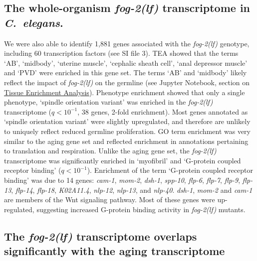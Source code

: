 \documentclass[10pt,letterpaper,twocolumn]{article}
\newcommand{\cel}{\emph{C.~elegans}}
\newcommand{\fog}{\emph{\mbox{fog-2(lf)}}}
\newcommand{\gene}[1]{\emph{\mbox{#1}}}
\newcommand{\fogn}{1,881}
\newcommand{\tffog}{60}
\begin{document}
\subsection*{The whole-organism \fog{} transcriptome in \cel{}.}

We were also able to identify \fogn{} genes associated with the \fog{} genotype,
including \tffog{} transcription factors (see SI file 3).
TEA showed that the terms `AB', `midbody', `uterine muscle', `cephalic sheath
cell', `anal depressor muscle' and `PVD' were enriched in this gene set. The
terms `AB' and `midbody' likely reflect the impact of \fog{} on the germline
(see Jupyter Notebook, section on
\href{https://wormlabcaltech.github.io/Angeles_Leighton_2016/RNASeqAnalysis.html#Run-TEA}
{Tissue Enrichment Analysis}).
Phenotype enrichment showed that only a single phenotype, `spindle orientation
variant' was enriched in the \fog{} transcriptome ($q<10^{-1}$, 38 genes, 2-fold
enrichment). Most genes annotated as `spindle orientation variant' were
slightly upregulated, and therefore are unlikely to uniquely reflect reduced
germline proliferation. GO term enrichment was very similar to the aging gene
set and reflected enrichment in annotations pertaining to translation and
respiration. Unlike the aging gene set, the \fog{} transcriptome was
significantly enriched in `myofibril' and `G-protein coupled receptor binding'
($q<10^{-1}$). Enrichment of the term `G-protein coupled receptor binding' was
due to 14 genes: \gene{cam-1}, \gene{mom-2},  \gene{dsh-1}, \gene{spp-10},
\gene{flp-6}, \gene{flp-7}, \gene{flp-9}, \gene{flp-13}, \gene{flp-14},
\gene{flp-18},
\gene{K02A11.4}, \gene{nlp-12}, \gene{nlp-13}, and \gene{nlp-40}.
\gene{dsh-1},
\gene{mom-2} and \gene{cam-1} are members of the Wnt signaling pathway.
Most of these genes were up-regulated, suggesting increased G-protein binding
activity in \fog{} mutants.

\subsection*{The \fog{} transcriptome overlaps significantly with the aging
transcriptome}
\end{document}
